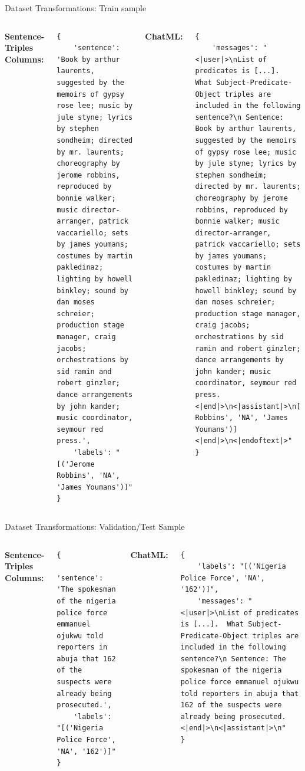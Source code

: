 \documentclass[aspectratio=169,xcolor=dvipsnames]{beamer}
\begin{document}
\begin{frame}[fragile]{Dataset Transformations: Train sample}
\begin{columns}[c]
\textbf{Sentence-Triples Columns:}
\begin{verbatim}
{
    'sentence': 'Book by arthur laurents, suggested by the memoirs of gypsy rose lee; music by jule styne; lyrics by stephen sondheim; directed by mr. laurents; choreography by jerome robbins, reproduced by bonnie walker; music director-arranger, patrick vaccariello; sets by james youmans; costumes by martin pakledinaz; lighting by howell binkley; sound by dan moses schreier; production stage manager, craig jacobs; orchestrations by sid ramin and robert ginzler; dance arrangements by john kander; music coordinator, seymour red press.', 
    'labels': "[('Jerome Robbins', 'NA', 'James Youmans')]"
}
\end{verbatim}
\textbf{ChatML:}
\begin{verbatim}
{
    'messages': "<|user|>\nList of predicates is [...].  What Subject-Predicate-Object triples are included in the following sentence?\n Sentence: Book by arthur laurents, suggested by the memoirs of gypsy rose lee; music by jule styne; lyrics by stephen sondheim; directed by mr. laurents; choreography by jerome robbins, reproduced by bonnie walker; music director-arranger, patrick vaccariello; sets by james youmans; costumes by martin pakledinaz; lighting by howell binkley; sound by dan moses schreier; production stage manager, craig jacobs; orchestrations by sid ramin and robert ginzler; dance arrangements by john kander; music coordinator, seymour red press.<|end|>\n<|assistant|>\n[('Jerome Robbins', 'NA', 'James Youmans')]<|end|>\n<|endoftext|>"
}
\end{verbatim}
\end{columns}
\end{frame}
\begin{frame}[fragile]{Dataset Transformations: Validation/Test Sample}
\begin{columns}[c]
\textbf{Sentence-Triples Columns:}
\begin{verbatim}
{
    'sentence': 'The spokesman of the nigeria police force emmanuel ojukwu told reporters in abuja that 162 of the suspects were already being prosecuted.', 
    'labels': "[('Nigeria Police Force', 'NA', '162')]"
}
\end{verbatim}
\textbf{ChatML:}
\begin{verbatim}
{
    'labels': "[('Nigeria Police Force', 'NA', '162')]", 
    'messages': "<|user|>\nList of predicates is [...].  What Subject-Predicate-Object triples are included in the following sentence?\n Sentence: The spokesman of the nigeria police force emmanuel ojukwu told reporters in abuja that 162 of the suspects were already being prosecuted.<|end|>\n<|assistant|>\n"
}
\end{verbatim}
\end{columns}
\end{frame}
\end{document}
